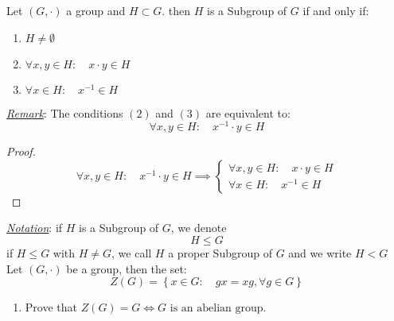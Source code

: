 \begin{proposition}
  
  Let $(G, \cdot )  $  a group and $H \subset G $. then $H $ is a Subgroup of $G $ if and only if:
  \begin{enumerate}
  \item $H \neq \emptyset  $ 
    \item $ \forall x,y \in  H: \quad x \cdot  y \in  H $  
      \item $\forall x \in  H: \quad x^{-1} \in  H $  
  \end{enumerate}
\end{proposition}
\underline{\emph{Remark}}: The conditions $(2)$ and $(3)$ are equivalent to:
\[
\forall x,y \in H: \quad x^{-1} \cdot  y \in  H 
\]
\begin{proof}
\[
\forall x,y \in H: \quad x^{-1}\cdot y \in  H \implies 
\begin{cases}
\forall x,y \in  H: \quad x \cdot  y \in  H \\
\forall x \in  H: \quad x^{-1} \in  H
\end{cases}
\]
\end{proof}
\underline{\emph{Notation}}: if $H $ is a Subgroup of $G $, 
we denote 
\[
H \leq G
\]
if $H \leq  G$ with $H \neq G $, we call $H $ a proper Subgroup of $G $ and we write $H < G$   \\
\exercise
Let $(G, \cdot )  $ be a group, then the set:
\[
Z(G) = \left\{ x \in  G: \quad  gx = xg , \forall g \in  G \right\} 
\]
\begin{enumerate}
  \item Prove that $Z(G) = G\iff G \text{ is an abelian group.} $ 
\end{enumerate}

